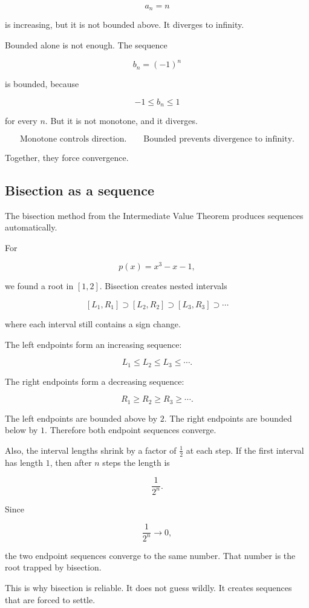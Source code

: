 \[
a_n=n
\]

is increasing, but it is not bounded above.  It diverges to infinity.

Bounded alone is not enough.  The sequence

\[
b_n=(-1)^n
\]

is bounded, because

\[
-1\le b_n\le1
\]

for every \(n\).  But it is not monotone, and it diverges.

\[
\boxed{
\text{Monotone controls direction.}
\qquad
\text{Bounded prevents divergence to infinity.}
}
\]

Together, they force convergence.

\subsection{Bisection as a sequence}
\label{subsec:bisection-as-sequence}

The bisection method from the Intermediate Value Theorem produces sequences automatically.

For

\[
p(x)=x^3-x-1,
\]

we found a root in \([1,2]\).  Bisection creates nested intervals

\[
[L_1,R_1]\supset [L_2,R_2]\supset [L_3,R_3]\supset\cdots
\]

where each interval still contains a sign change.

The left endpoints form an increasing sequence:

\[
L_1\le L_2\le L_3\le\cdots.
\]

The right endpoints form a decreasing sequence:

\[
R_1\ge R_2\ge R_3\ge\cdots.
\]

The left endpoints are bounded above by \(2\).  The right endpoints are bounded below by \(1\).  Therefore both endpoint sequences converge.

Also, the interval lengths shrink by a factor of \(\frac12\) at each step.  If the first interval has length \(1\), then after \(n\) steps the length is

\[
\frac1{2^n}.
\]

Since

\[
\frac1{2^n}\to0,
\]

the two endpoint sequences converge to the same number.  That number is the root trapped by bisection.

This is why bisection is reliable.  It does not guess wildly.  It creates sequences that are forced to settle.

